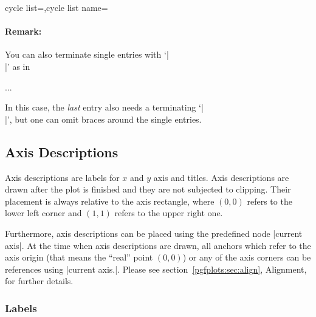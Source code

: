 \begin{pgfplotskeylist}{cycle list=,cycle list name=}
\paragraph{Remark:} You can also terminate single entries with `|\\|' as in
\begin{codeexample}
\begin{axis}[cycle list={%
	blue,mark=*\\%
	red,mark=square\\%
	dashed,mark=o\\%
	loosely dotted,mark=+\\%
	brown!60!black,
		mark options={fill=brown!40},
		mark=otimes*\\}
]
...
\end{axis}
\end{codeexample}
In this case, the \emph{last} entry also needs a terminating `|\\|', but one can omit braces around the single entries.
\end{pgfplotskeylist}




\subsection{Axis Descriptions}
Axis descriptions are labels for $x$ and $y$ axis and titles. Axis descriptions are drawn after the plot is finished and they are not subjected to clipping. Their placement is always relative to the axis rectangle, where $(0,0)$ refers to the lower left corner and $(1,1)$ refers to the upper right one.

Furthermore, axis descriptions can be placed using the predefined node |current axis|. At the time when axis descriptions are drawn, all anchors which refer to the axis origin (that means the ``real'' point $(0,0)$) or any of the axis corners can be references using |current axis.|. Please see section~\ref{pgfplots:sec:align}, Alignment, for further details.

\subsubsection{Labels}


